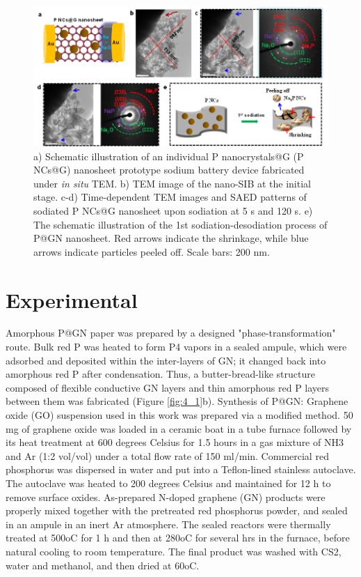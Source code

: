 \begin{figure}  
\includegraphics[width=370pt,angle=0]{figures/figure4_s3}
\caption[Layered structure design]
{a) Schematic illustration of an individual P nanocrystals@G (P NCs@G) nanosheet prototype sodium battery device fabricated under {\em in situ} TEM. b) TEM image of the nano-SIB at the initial stage. c-d) Time-dependent TEM images and SAED patterns of sodiated P NCs@G nanosheet upon sodiation at 5 s and 120 s. e) The schematic illustration of the 1st sodiation-desodiation process of P@GN nanosheet. Red arrows indicate the shrinkage, while blue arrows indicate particles peeled off. Scale bars: 200 nm. 
\label{fig:4_s3}}
\end{figure}

\section{Experimental}
Amorphous P@GN paper was prepared by a designed "phase-transformation" route. Bulk red P was heated to form P4 vapors in a sealed ampule, which were adsorbed and deposited within the inter-layers of GN; it changed back into amorphous red P after condensation.\cite{Roth1947b} Thus, a butter-bread-like structure composed of flexible conductive GN layers and thin amorphous red P layers between them was fabricated (Figure \ref{fig:4_1}b). 
Synthesis of P@GN: Graphene oxide (GO) suspension used in this work was prepared via a modified method. 50 mg of graphene oxide was loaded in a ceramic boat in a tube furnace followed by its heat treatment at 600 degrees Celsius for 1.5 hours in a gas mixture of NH3 and Ar (1:2 vol/vol) under a total flow rate of 150 ml/min. Commercial red phosphorus was dispersed in water and put into a Teflon-lined stainless autoclave. The autoclave was heated to 200 degrees Celsius and maintained for 12 h to remove surface oxides. As-prepared N-doped graphene (GN) products were properly mixed together with the pretreated red phosphorus powder, and sealed in an ampule in an inert Ar atmosphere. The sealed reactors were thermally treated at 500oC for 1 h and then at 280oC for several hrs in the furnace, before natural cooling to room temperature. The final product was washed with CS2, water and methanol, and then dried at 60oC.\\

